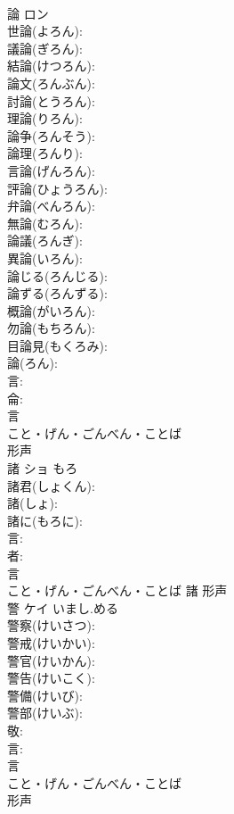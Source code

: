 \documentclass[8pt]{extreport}
\begin{document}
\begin{CJK}{UTF8}{min}
\\	論	ロン			
\\	世論(よろん): 
\\	議論(ぎろん): 
\\	結論(けつろん): 
\\	論文(ろんぶん): 
\\	討論(とうろん): 
\\	理論(りろん): 
\\	論争(ろんそう): 
\\	論理(ろんり): 
\\	言論(げんろん): 
\\	評論(ひょうろん): 
\\	弁論(べんろん): 
\\	無論(むろん): 
\\	論議(ろんぎ): 
\\	異論(いろん): 
\\	論じる(ろんじる): 
\\	論ずる(ろんずる): 
\\	概論(がいろん): 
\\	勿論(もちろん): 
\\	目論見(もくろみ): 
\\	論(ろん): 
\\	言: 
\\	侖: 
\\	言	
\\	こと・げん・ごんべん・ことば	
\\	形声 
\\	諸	ショ	もろ		
\\	諸君(しょくん): 
\\	諸(しょ): 
\\	諸に(もろに): 
\\	言: 
\\	者: 
\\	言	
\\	こと・げん・ごんべん・ことば	諸	形声 
\\	警	ケイ	いまし.める		
\\	警察(けいさつ): 
\\	警戒(けいかい): 
\\	警官(けいかん): 
\\	警告(けいこく): 
\\	警備(けいび): 
\\	警部(けいぶ): 
\\	敬: 
\\	言: 
\\	言	
\\	こと・げん・ごんべん・ことば	
\\	形声 

\end{CJK}
\end{document}
